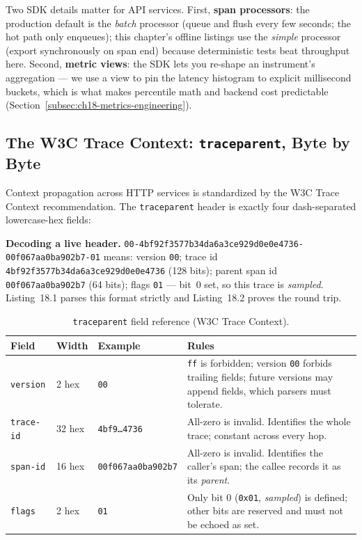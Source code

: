 Two SDK details matter for API services. First, \textbf{span processors}:
the production default is the \emph{batch} processor (queue and flush every
few seconds; the hot path only enqueues); this chapter's offline listings
use the \emph{simple} processor (export synchronously on span end) because
deterministic tests beat throughput here. Second, \textbf{metric views}:
the SDK lets you re-shape an instrument's aggregation --- we use a view to
pin the latency histogram to explicit millisecond buckets, which is what
makes percentile math and backend cost predictable
(Section~\ref{subsec:ch18-metrics-engineering}).

\subsection{The W3C Trace Context: \texttt{traceparent}, Byte by Byte}
\label{subsec:ch18-traceparent}

Context propagation across HTTP services is standardized by the W3C Trace
Context recommendation. The \texttt{traceparent} header is exactly four
dash-separated lowercase-hex fields:

\begin{examplebox}
\textbf{Decoding a live header.}
\texttt{00-4bf92f3577b34da6a3ce929d0e0e4736-00f067aa0ba902b7-01} means:
version \texttt{00}; trace id \texttt{4bf92f3577b34da6a3ce929d0e0e4736}
(128 bits); parent span id \texttt{00f067aa0ba902b7} (64 bits); flags
\texttt{01} --- bit~0 set, so this trace is \emph{sampled}. Listing~18.1
parses this format strictly and Listing~18.2 proves the round trip.
\end{examplebox}

\begin{table}[ht]
  \centering
  \small
  \begin{tabularx}{\textwidth}{l l l X}
    \toprule
    \textbf{Field} & \textbf{Width} & \textbf{Example} & \textbf{Rules} \\
    \midrule
    \texttt{version}   & 2 hex  & \texttt{00} & \texttt{ff} is forbidden; version \texttt{00} forbids trailing fields; future versions may append fields, which parsers must tolerate. \\
    \texttt{trace-id}  & 32 hex & \texttt{4bf9\ldots4736} & All-zero is invalid. Identifies the whole trace; constant across every hop. \\
    \texttt{span-id}   & 16 hex & \texttt{00f067aa0ba902b7} & All-zero is invalid. Identifies the caller's span; the callee records it as its \emph{parent}. \\
    \texttt{flags}     & 2 hex  & \texttt{01} & Only bit 0 (\texttt{0x01}, \emph{sampled}) is defined; other bits are reserved and must not be echoed as set. \\
    \bottomrule
  \end{tabularx}
  \caption{\texttt{traceparent} field reference (W3C Trace Context).}
  \label{tab:ch18-traceparent}
\end{table}

